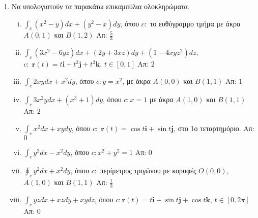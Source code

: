



\everymath{\displaystyle}
\thispagestyle{empty}



\begin{center}
\end{center}


\vspace{\baselineskip}


\begin{enumerate}
    \item Να υπολογιστούν τα παρακάτω επικαμπύλια ολοκληρώματα.

        \begin{enumerate}[i)]
            \item $ \int_{c} (x^{2}-y)dx + (y^{2}-x)dy $, \quad όπου $ c:
                $ το ευθύγραμμο τμήμα με άκρα $ A(0,1) $ και $ B(1,2) $ \hfill Απ: $
                \frac{5}{3}$ 

            \item $ \int_{c} (3x^{2}-6yz)dx+(2y+3xz)dy+(1-4xyz^{2})dz $, \quad $ c:\;
                \mathbf{r}(t)=t \mathbf{i}+t^{2} \mathbf{j}+ t^{3} \mathbf{k} $, $ t \in [0,1]$
                \hfill Απ: $ 2 $  

            \item $ \int_{c} 2xy dx + x^{2} dy $, \quad όπου $ c: y=x^{2} $, με άκρα $ A(0,0) $ και
                $ B(1,1) $ \hfill Απ: $ 1 $ 

            \item $ \int_{c} 3x^{2}y dx + (x^{3}+1)dy $, \quad όπου $ c: x=1 $ με άκρα $ A(1,0)
                $ και $ B(1,1) $ \hfill Απ: $ 2 $ 

            \item $ \int_{c} x^{2}dx+xy dy $, \quad όπου $ c:\; \mathbf{r}(t) = \cos{t} \mathbf{i}
                + \sin{t} \mathbf{j} $, στο 1ο τεταρτημόριο. \hfill Απ: $ 0 $

            \item $ \int_{c} y^{2}dx - x^{2}dy $, \quad όπου $ c: x^{2}+y^{2}=1 $ \hfill Απ: $ 0 $ 

            \item $ \oint_{c} y^{2}dx + x^{2}dy $, \quad όπου $ c: $  περίμετρος τριγώνου  με 
                κορυφές $ O(0,0) $, $ A(1,0) $ και $ B(1,1) $ \hfill Απ: $ \frac{1}{3} $ 

            \item $ \int_{c} yzdx+xzdy+xydz  $, \quad όπου $ c: \mathbf{r}(t) = t \mathbf{i}+
                \sin{t} \mathbf{j} + \cos{t} \mathbf{k}$, $ t \in [0, 2 \pi] $ \hfill Απ: $ 0 $ 


\end{enumerate}
\end{enumerate}

